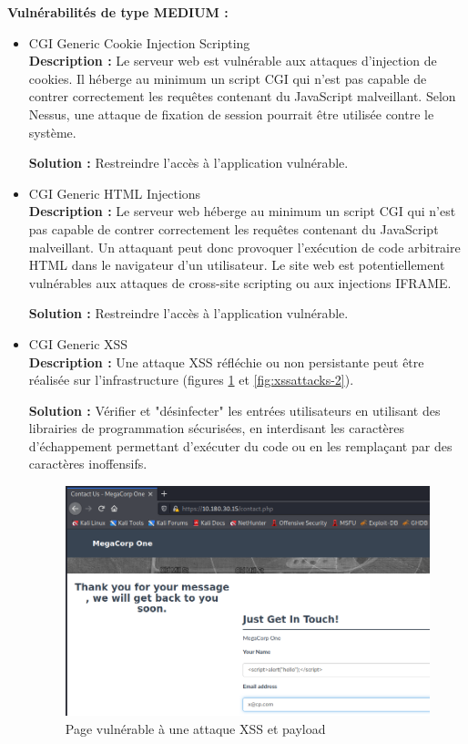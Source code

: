 \documentclass[french,paper=a4,oneside,captions=tableheading]{article}
\begin{document}
\textbf{Vulnérabilités de type MEDIUM :}\\
\begin{itemize}
    \item CGI Generic Cookie Injection Scripting \\
\textbf{Description :}
Le serveur web est vulnérable aux attaques d'injection de cookies. Il héberge au minimum un script CGI qui n'est pas capable de contrer correctement les requêtes contenant du JavaScript malveillant. Selon Nessus, une attaque de fixation de session pourrait être utilisée contre le système.

\textbf{Solution :}
Restreindre l'accès à l'application vulnérable.\\

    \item CGI Generic HTML Injections \\
\textbf{Description :}
Le serveur web héberge au minimum un script CGI qui n'est pas capable de contrer correctement les requêtes contenant du JavaScript malveillant. Un attaquant peut donc provoquer l'exécution de code arbitraire HTML dans le navigateur d'un utilisateur. Le site web est potentiellement vulnérables aux attaques de cross-site scripting ou aux injections IFRAME.

\textbf{Solution :}
Restreindre l'accès à l'application vulnérable.\\

    \item CGI Generic XSS \\
\textbf{Description :}
Une attaque XSS réfléchie ou non persistante peut être réalisée sur l'infrastructure (figures \ref{fig:xssattacks-1} et \ref{fig:xssattacks-2}).

\textbf{Solution :}
Vérifier et "désinfecter" les entrées utilisateurs en utilisant des librairies de programmation sécurisées, en interdisant les caractères d'échappement permettant d'exécuter du code ou en les remplaçant par des caractères inoffensifs.

\begin{figure}[H]
    \centering
    \includegraphics[width=0.99\linewidth]{images/xssattacks-1.png}
    \caption{Page vulnérable à une attaque XSS et payload}
    \label{fig:xssattacks-1}
\end{figure}


\end{itemize}
\end{document}
